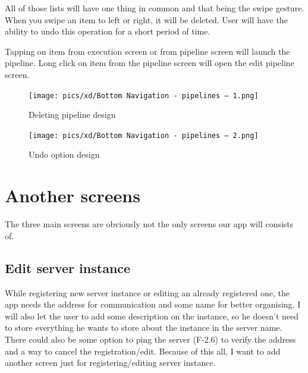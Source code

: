 All of those lists will have one thing in common and that being the swipe gesture.
When you swipe an item to left or right, it will be deleted.
User will have the ability to undo this operation for a short period of time.

Tapping on item from execution screen or from pipeline screen will launch the pipeline.
Long click on item from the pipeline screen will open the edit pipeline screen.

\begin{figure}\centering
    \begin{minipage}[b]{0.32\textwidth}
    	\texttt{[image: pics/xd/Bottom Navigation - pipelines – 1.png]}
    	\caption[Deleting pipeline]{Deleting pipeline design}\label{fig:xdDeletePipeline}
    \end{minipage}
    \begin{minipage}[b]{0.32\textwidth}
    	\texttt{[image: pics/xd/Bottom Navigation - pipelines – 2.png]}
    	\caption[Undo option]{Undo option design}\label{fig:xdUndo}
    \end{minipage}
\end{figure}

\section{Another screens}
The three main screens are obviously not the only screens our app will consists of.

\subsection{Edit server instance}
While registering new server instance or editing an already registered one, the app needs the address for communication and some name for better organising.
I will also let the user to add some description on the instance, so he doesn't need to store everything he wants to store about the instance in the server name.
There could also be some option to ping the server (F-2.6) to verify the address and a way to cancel the registration/edit.
Because of this all, I want to add another screen just for registering/editing server instance.


